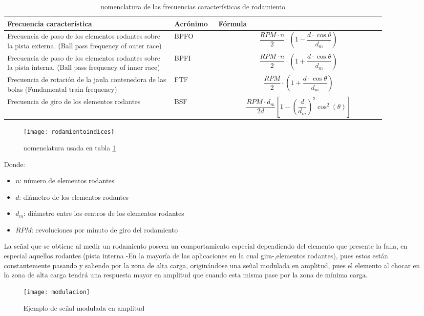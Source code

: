  				\begin{center}
 					\begin{table}
 						\caption{nomenclatura de las frecuencias características de rodamiento}
 						\label{tab:frecuenciasrodamiento}
	 					\begin{tabular}{| >{\centering\arraybackslash}m{0.4\linewidth} | >{\centering\arraybackslash}m{0.1\linewidth} |>{\centering\arraybackslash}m{0.4\linewidth}| } 		
	 						\hline
	 						Frecuencia característica & \scriptsize{Acrónimo} & Fórmula \\ \hline \hline
	 						Frecuencia de paso de los elementos rodantes sobre la pista externa.
	 						(Ball pass frequency of outer race) & BPFO & $$\frac{RPM\cdot n}{2}\cdot \left (1-\frac{d\cdot\cos{\theta}}{d_{m}}\right )$$ \\ \hline
	 						Frecuencia de paso de los elementos rodantes sobre la pista interna.
	 						(Ball pass frequency of inner race) & BPFI & $$\frac{RPM\cdot n}{2}\cdot\left (1+\frac{d\cdot\cos{\theta}}{d_{m}}\right )$$ \\ \hline
	 						Frecuencia de rotación de la jaula contenedora de las bolas (Fundamental train frequency) & FTF & $$\frac{RPM}{2}\cdot \left (1+\frac{d\cdot\cos{\theta}}{d_{m}}\right )$$ \\ \hline
	 						Frecuencia de giro de los elementos rodantes & BSF & $$\frac{RPM \cdot  d_{m}}{2d}\left[1-\left(\frac{d}{d_{m}}\right)^2 \cos^2(\theta)\right]$$ \\ \hline
	 					\end{tabular}
 					\end{table}					
 				\end{center}
 			\begin{figure}
 				\centering
 				\texttt{[image: rodamientoindices]}
				\caption{nomenclatura usada en tabla \ref{tab:frecuenciasrodamiento}}
 				\label{fig:rodamientopartes}
 			\end{figure}
 			Donde:
	 		\begin{itemize}
	 			\item $n$: número de elementos rodantes
	 			\item $d$: diámetro de los elementos rodantes
	 			\item $d_{m}$: diámetro entre los centros de los elementos rodantes
	 			\item $RPM$: revoluciones por minuto de giro del rodamiento
	 		\end{itemize}
	 	La señal que se obtiene al medir un rodamiento poseen un comportamiento especial dependiendo del elemento que presente la falla, en especial aquellos rodantes (pista interna -En la mayoría de las aplicaciones en la cual gira-,elementos rodantes), pues estos están constantemente pasando y saliendo por la zona de alta carga, originándose una señal modulada en amplitud, pues el elemento al chocar en la zona de alta carga tendrá una respuesta mayor en amplitud que cuando esta misma pase por la zona de mínima carga.
 		\begin{figure}
			\centering
			\texttt{[image: modulacion]}
			\caption{Ejemplo de señal modulada en amplitud}
			\label{fig:modulacion}
		\end{figure}
		
